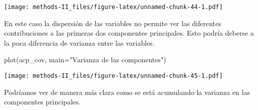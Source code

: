 \documentclass[
]{article}
\newenvironment{Shaded}{\begin{snugshade}}{\end{snugshade}}
\newcommand{\AttributeTok}[1]{\textcolor[rgb]{0.77,0.63,0.00}{#1}}
\newcommand{\DecValTok}[1]{\textcolor[rgb]{0.00,0.00,0.81}{#1}}
\newcommand{\FunctionTok}[1]{\textcolor[rgb]{0.00,0.00,0.00}{#1}}
\newcommand{\NormalTok}[1]{#1}
\newcommand{\OtherTok}[1]{\textcolor[rgb]{0.56,0.35,0.01}{#1}}
\newcommand{\SpecialCharTok}[1]{\textcolor[rgb]{0.00,0.00,0.00}{#1}}
\newcommand{\StringTok}[1]{\textcolor[rgb]{0.31,0.60,0.02}{#1}}
\begin{document}
\texttt{[image: methods-II\_files/figure-latex/unnamed-chunk-44-1.pdf]}

En este caso la dispersión de las variables no permite ver las
diferentes contribuciones a las primeras dos componentes principales.
Esto podría deberse a la poca diferencia de varianza entre las
variables.

\begin{Shaded}
\begin{Highlighting}[]
\FunctionTok{plot}\NormalTok{(acp\_cov, }\AttributeTok{main=}\StringTok{"Varianza de las componentes"}\NormalTok{)}
\end{Highlighting}
\end{Shaded}

\texttt{[image: methods-II\_files/figure-latex/unnamed-chunk-45-1.pdf]}

Podríamos ver de manera más clara como se está acumulando la varianza en
las componentes principales.

\begin{Shaded}
\end{Shaded}
\end{document}
